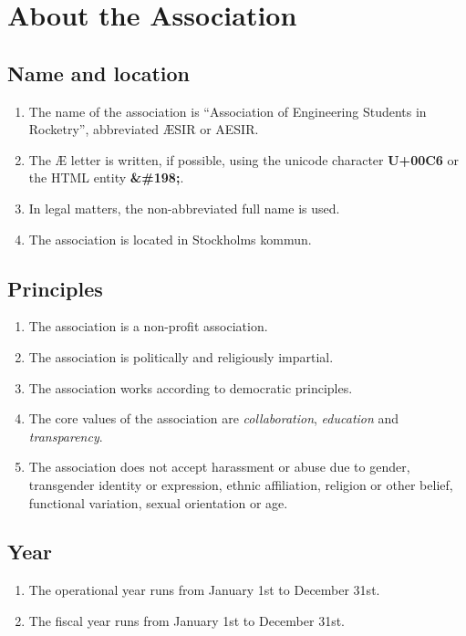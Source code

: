 
\section*{About the Association}

\subsection{Name and location}
\begin{enumerate}
  \item The name of the association is “Association of Engineering Students in Rocketry”, abbreviated ÆSIR or AESIR.
  \item The Æ letter is written, if possible, using the unicode character \textbf{U+00C6} or the HTML entity \textbf{\&\#198;}.
  \item In legal matters, the non-abbreviated full name is used.
  \item The association is located in Stockholms kommun.
\end{enumerate}

\subsection{Principles}
\begin{enumerate}
  \item The association is a non-profit association.
  \item The association is politically and religiously impartial.
  \item The association works according to democratic principles.
  \item The core values of the association are \emph{collaboration}, \emph{education} and \emph{transparency}.
  \item The association does not accept harassment or abuse due to gender, transgender identity or expression, ethnic affiliation, religion or other belief, functional variation, sexual orientation or age.
\end{enumerate}


\subsection{Year}
\begin{enumerate}
  \item The operational year runs from January 1st to December 31st.
  \item The fiscal year runs from January 1st to December 31st.
\end{enumerate}


